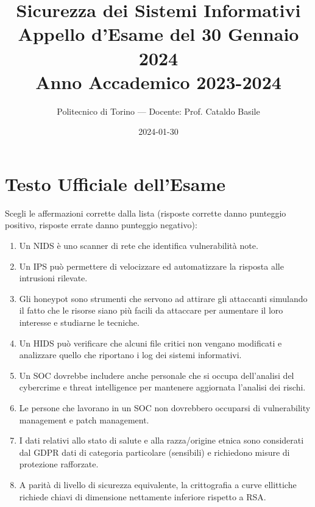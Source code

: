 \documentclass[11pt,a4paper]{article}
\begin{document}
\title{\textbf{Sicurezza dei Sistemi Informativi} \\ \large Appello d'Esame del 30 Gennaio 2024 \\ \small Anno Accademico 2023-2024}
\author{Politecnico di Torino --- Docente: Prof. Cataldo Basile}
\date{2024-01-30}
\maketitle


\section{Testo Ufficiale dell'Esame}

\begin{questionbox}
Scegli le affermazioni corrette dalla lista (risposte corrette danno punteggio positivo, risposte errate danno punteggio negativo):
\begin{enumerate}[label=\alph*.]
    \item Un NIDS \`e uno scanner di rete che identifica vulnerabilit\`a note.
    \item Un IPS pu\`o permettere di velocizzare ed automatizzare la risposta alle intrusioni rilevate.
    \item Gli honeypot sono strumenti che servono ad attirare gli attaccanti simulando il fatto che le risorse siano pi\`u facili da attaccare per aumentare il loro interesse e studiarne le tecniche.
    \item Un HIDS pu\`o verificare che alcuni file critici non vengano modificati e analizzare quello che riportano i log dei sistemi informativi.
    \item Un SOC dovrebbe includere anche personale che si occupa dell'analisi del cybercrime e threat intelligence per mantenere aggiornata l'analisi dei rischi.
    \item Le persone che lavorano in un SOC non dovrebbero occuparsi di vulnerability management e patch management.
    \item I dati relativi allo stato di salute e alla razza/origine etnica sono considerati dal GDPR dati di categoria particolare (sensibili) e richiedono misure di protezione rafforzate.
    \item A parit\`a di livello di sicurezza equivalente, la crittografia a curve ellittiche richiede chiavi di dimensione nettamente inferiore rispetto a RSA.
\end{enumerate}
\end{questionbox}
\end{document}
